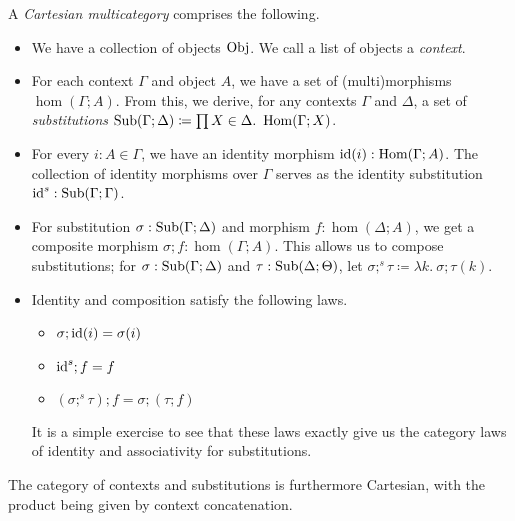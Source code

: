 \begin{definition}
  A \emph{Cartesian multicategory} comprises the following.

  \begin{itemize}
    \item We have a collection of objects $\operatorname{Obj}$.
          We call a list of objects a \emph{context}.
    \item For each context $\Gamma$ and object $A$, we have a set of
          (multi)morphisms $\hom(\Gamma; A)$.
          From this, we derive, for any contexts $\Gamma$ and $\Delta$, a set
          of \emph{substitutions}
          $\operatorname{Sub}(\Gamma; \Delta) \coloneqq \prod X \in \Delta.~\operatorname{Hom}(\Gamma; X)$.
    \item For every $i : A \in \Gamma$, we have an identity morphism
          $\operatorname{id}(i) : \operatorname{Hom}(\Gamma; A)$.
          The collection of identity morphisms over $\Gamma$ serves as the
          identity substitution $\operatorname{id}^s : \operatorname{Sub}(\Gamma; \Gamma)$.
    \item For substitution $\sigma : \operatorname{Sub}(\Gamma; \Delta)$ and morphism
          $f : \hom(\Delta; A)$, we get a composite morphism
          $\sigma ; f : \hom(\Gamma; A)$.
          This allows us to compose substitutions; for
          $\sigma : \operatorname{Sub}(\Gamma; \Delta)$ and $\tau : \operatorname{Sub}(\Delta; \Theta)$,
          let $\sigma;^s \tau \coloneqq \lambda k.~\sigma; \tau(k)$.
    \item Identity and composition satisfy the following laws.
          \begin{itemize}
            \item $\sigma; \operatorname{id}(i) = \sigma(i)$
            \item $\operatorname{id}^s; f = f$
            \item $(\sigma;^s \tau); f = \sigma; (\tau; f)$
          \end{itemize}
          It is a simple exercise to see that these laws exactly give us the
          category laws of identity and associativity for substitutions.
  \end{itemize}
\end{definition}

The category of contexts and substitutions is furthermore Cartesian, with the
product being given by context concatenation.
